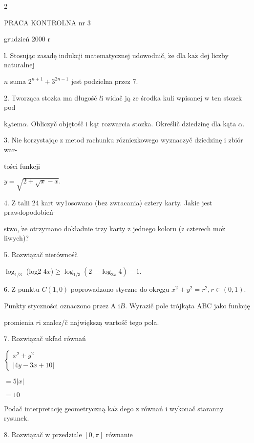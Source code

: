 \documentclass[a4paper,12pt]{article}
\begin{document}
2





PRACA KONTROLNA nr 3

grudzień 2000 $\mathrm{r}$

l. Stosując zasadę indukcji matematycznej udowodnič, $\dot{\mathrm{z}}\mathrm{e}$ dla $\mathrm{k}\mathrm{a}\dot{\mathrm{z}}$ dej liczby naturalnej

$n$ suma $2^{n+1}+3^{2n-1}$ jest podzielna przez 7.

2. Tworząca stozka ma długośč $l\mathrm{i}$ widač ją ze środka kuli wpisanej $\mathrm{w}$ ten stozek pod

$\mathrm{k}_{\Phi}\mathrm{t}\mathrm{e}\mathrm{m}\alpha$. Obliczyč objętośč $\mathrm{i}$ kąt rozwarcia stozka. Określič dziedzinę dla kąta $\alpha.$

3. Nie korzystajqc $\mathrm{z}$ metod rachunku rózniczkowego wyznaczyč dziedzinę $\mathrm{i}$ zbiór war-

tości funkcji

$y=\sqrt{2+\sqrt{x}-x}.$

4. $\mathrm{Z}$ talii 24 kart wy1osowano (bez zwracania) cztery karty. Jakie jest prawdopodobień-

stwo, $\dot{\mathrm{z}}\mathrm{e}$ otrzymano dokładnie trzy karty $\mathrm{z}$ jednego koloru ($\mathrm{z}$ czterech $\mathrm{m}\mathrm{o}\dot{\mathrm{z}}$ liwych)?

5. Rozwiązač nierównośč

$\log_{1/3}$ (log2 $4x$)$\geq\log_{1/3}(2-\log_{2x}4)-1.$

6. $\mathrm{Z}$ punktu $C(1,0)$ poprowadzono styczne do okręgu $x^{2}+y^{2} =r^{2}, r \in (0,1).$

Punkty styczności oznaczono przez A $\mathrm{i}B$. Wyrazič pole trójkąta ABC jako funkcję

promienia $r\mathrm{i}$ znalez/č największą wartośč tego pola.

7. Rozwiązač ukfad równań

$\left\{\begin{array}{l}
x^{2}+y^{2}\\
|4y-3x+10|
\end{array}\right.$

$=5|x|$

$=10$

Podač interpretację geometryczną $\mathrm{k}\mathrm{a}\dot{\mathrm{z}}$ dego $\mathrm{z}$ równań $\mathrm{i}$ wykonač staranny rysunek.

8. Rozwiązač $\mathrm{w}$ przedziale $[0,\pi]$ równanie
\end{document}
